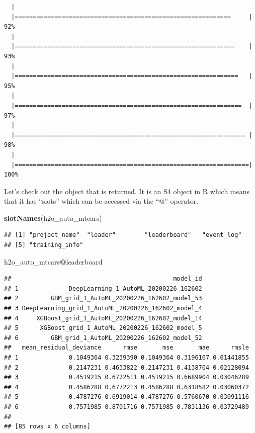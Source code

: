 \documentclass[]{book}
\newenvironment{Shaded}{\begin{snugshade}}{\end{snugshade}}
\newcommand{\KeywordTok}[1]{\textcolor[rgb]{0.13,0.29,0.53}{\textbf{#1}}}
\newcommand{\OperatorTok}[1]{\textcolor[rgb]{0.81,0.36,0.00}{\textbf{#1}}}
\newcommand{\NormalTok}[1]{#1}
\begin{document}
\begin{verbatim}
  |                                                                       
  |============================================================     |  92%
  |                                                                       
  |=============================================================    |  93%
  |                                                                       
  |==============================================================   |  95%
  |                                                                       
  |===============================================================  |  97%
  |                                                                       
  |================================================================ |  98%
  |                                                                       
  |=================================================================| 100%
\end{verbatim}

Let's check out the object that is returned. It is an S4 object in R
which means that it has ``slots'' which can be accessed via the ``@''
operator.

\begin{Shaded}
\begin{Highlighting}[]
\KeywordTok{slotNames}\NormalTok{(h2o_auto_mtcars)}
\end{Highlighting}
\end{Shaded}

\begin{verbatim}
## [1] "project_name"  "leader"        "leaderboard"   "event_log"    
## [5] "training_info"
\end{verbatim}

\begin{Shaded}
\begin{Highlighting}[]
\NormalTok{h2o_auto_mtcars}\OperatorTok{@}\NormalTok{leaderboard}
\end{Highlighting}
\end{Shaded}

\begin{verbatim}
##                                             model_id
## 1              DeepLearning_1_AutoML_20200226_162602
## 2         GBM_grid_1_AutoML_20200226_162602_model_53
## 3 DeepLearning_grid_1_AutoML_20200226_162602_model_4
## 4     XGBoost_grid_1_AutoML_20200226_162602_model_14
## 5      XGBoost_grid_1_AutoML_20200226_162602_model_5
## 6         GBM_grid_1_AutoML_20200226_162602_model_52
##   mean_residual_deviance      rmse       mse       mae      rmsle
## 1              0.1049364 0.3239390 0.1049364 0.3196167 0.01441855
## 2              0.2147231 0.4633822 0.2147231 0.4138704 0.02128094
## 3              0.4519215 0.6722511 0.4519215 0.6689904 0.03046289
## 4              0.4586288 0.6772213 0.4586288 0.6318582 0.03060372
## 5              0.4787276 0.6919014 0.4787276 0.5760670 0.03091116
## 6              0.7571985 0.8701716 0.7571985 0.7831136 0.03729489
## 
## [85 rows x 6 columns]
\end{verbatim}
\end{document}
